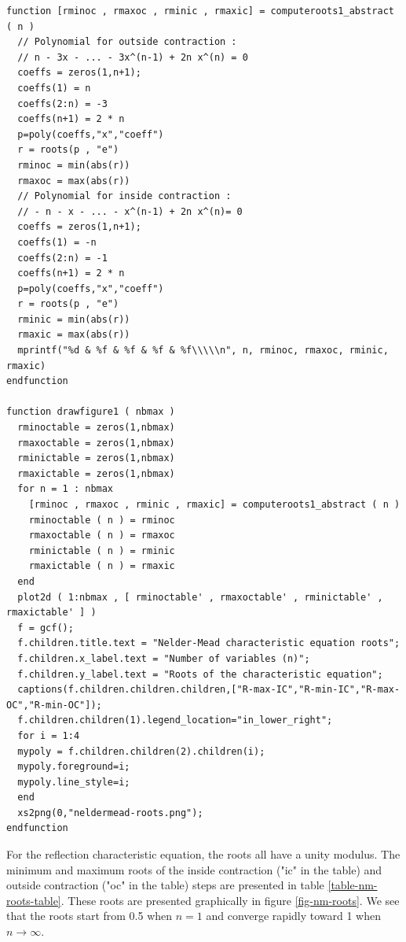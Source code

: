 \lstset{language=scilabscript}
\begin{lstlisting}
function [rminoc , rmaxoc , rminic , rmaxic] = computeroots1_abstract ( n )
  // Polynomial for outside contraction :
  // n - 3x - ... - 3x^(n-1) + 2n x^(n) = 0
  coeffs = zeros(1,n+1);
  coeffs(1) = n
  coeffs(2:n) = -3
  coeffs(n+1) = 2 * n
  p=poly(coeffs,"x","coeff")
  r = roots(p , "e")
  rminoc = min(abs(r))
  rmaxoc = max(abs(r))
  // Polynomial for inside contraction :
  // - n - x - ... - x^(n-1) + 2n x^(n)= 0
  coeffs = zeros(1,n+1);
  coeffs(1) = -n
  coeffs(2:n) = -1
  coeffs(n+1) = 2 * n
  p=poly(coeffs,"x","coeff")
  r = roots(p , "e")
  rminic = min(abs(r))
  rmaxic = max(abs(r))
  mprintf("%d & %f & %f & %f & %f\\\\\n", n, rminoc, rmaxoc, rminic, rmaxic)
endfunction

function drawfigure1 ( nbmax )
  rminoctable = zeros(1,nbmax)
  rmaxoctable = zeros(1,nbmax)
  rminictable = zeros(1,nbmax)
  rmaxictable = zeros(1,nbmax)
  for n = 1 : nbmax
    [rminoc , rmaxoc , rminic , rmaxic] = computeroots1_abstract ( n )
    rminoctable ( n ) = rminoc
    rmaxoctable ( n ) = rmaxoc
    rminictable ( n ) = rminic
    rmaxictable ( n ) = rmaxic
  end
  plot2d ( 1:nbmax , [ rminoctable' , rmaxoctable' , rminictable' , rmaxictable' ] )
  f = gcf();
  f.children.title.text = "Nelder-Mead characteristic equation roots";
  f.children.x_label.text = "Number of variables (n)";
  f.children.y_label.text = "Roots of the characteristic equation";
  captions(f.children.children.children,["R-max-IC","R-min-IC","R-max-OC","R-min-OC"]);
  f.children.children(1).legend_location="in_lower_right";
  for i = 1:4
  mypoly = f.children.children(2).children(i);
  mypoly.foreground=i;
  mypoly.line_style=i;
  end
  xs2png(0,"neldermead-roots.png");
endfunction
\end{lstlisting}

For the reflection characteristic equation, the roots all have 
a unity modulus.
The minimum and maximum roots of the inside contraction ("ic" in the table) and 
outside contraction ("oc" in the table) steps are 
presented in table \ref{table-nm-roots-table}. These 
roots are presented graphically in figure \ref{fig-nm-roots}.
We see that the roots start from 0.5 when $n=1$ and 
converge rapidly toward 1 when $n\rightarrow \infty$.

